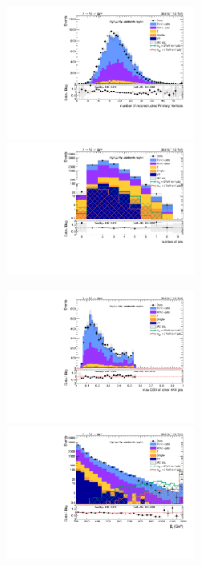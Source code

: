\begin{figure}[!htb]
  \begin{center}  
    \includegraphics[width=0.495\textwidth]{plots/v9_thesis/XVZnnhpSB/nPV.pdf}
    \includegraphics[width=0.495\textwidth]{plots/v9_thesis/XVZnnhpSB/nJets.pdf}

    \includegraphics[width=0.495\textwidth]{plots/v9_thesis/XVZnnhpSB/MaxJetBTag.pdf}
    \includegraphics[width=0.495\textwidth]{plots/v9_thesis/XVZnnhpSB/MEt_pt.pdf}


\end{center}
\end{figure}

